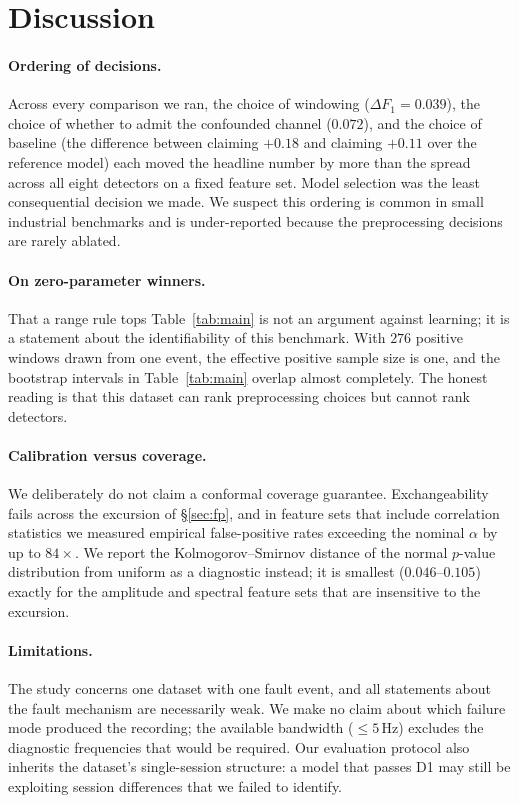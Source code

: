 \documentclass[twocolumn,10pt]{article}
\begin{document}
\section{Discussion}

\paragraph{Ordering of decisions.} Across every comparison we ran, the choice
of windowing ($\Delta F_1 = 0.039$), the choice of whether to admit the
confounded channel ($0.072$), and the choice of baseline (the difference
between claiming $+0.18$ and claiming $+0.11$ over the reference model) each
moved the headline number by more than the spread across all eight detectors on
a fixed feature set. Model selection was the least consequential decision we
made. We suspect this ordering is common in small industrial benchmarks and is
under-reported because the preprocessing decisions are rarely ablated.

\paragraph{On zero-parameter winners.} That a range rule tops
Table~\ref{tab:main} is not an argument against learning; it is a statement
about the identifiability of this benchmark. With $276$ positive windows drawn
from one event, the effective positive sample size is one, and the bootstrap
intervals in Table~\ref{tab:main} overlap almost completely. The honest reading
is that this dataset can rank preprocessing choices but cannot rank detectors.

\paragraph{Calibration versus coverage.} We deliberately do not claim a
conformal coverage guarantee. Exchangeability fails across the excursion of
\S\ref{sec:fp}, and in feature sets that include correlation statistics we
measured empirical false-positive rates exceeding the nominal $\alpha$ by up to
$84\times$. We report the Kolmogorov--Smirnov distance of the normal
$p$-value distribution from uniform as a diagnostic instead; it is smallest
($0.046$--$0.105$) exactly for the amplitude and spectral feature sets that are
insensitive to the excursion.

\paragraph{Limitations.} The study concerns one dataset with one fault event,
and all statements about the fault mechanism are necessarily weak. We make no
claim about which failure mode produced the recording; the available bandwidth
($\leq 5$\,Hz) excludes the diagnostic frequencies that would be required. Our
evaluation protocol also inherits the dataset's single-session structure: a
model that passes D1 may still be exploiting session differences that we failed
to identify.
\end{document}

